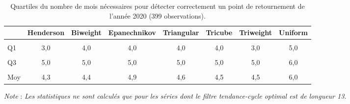 \documentclass[
  11pt,
  french,
  a4paper]{article}
\newcommand\1{\mathds{1}}
\begin{document}
\begin{table}[!h]

\caption{\label{tab:covid-tp-kernels}Quartiles du nombre de mois nécessaires pour détecter correctement un point de retournement de l'année 2020 (399 observations).}
\centering
\begin{tabular}[t]{lccccccc}
\toprule
  & Henderson & Biweight & Epanechnikov & Triangular & Tricube & Triweight & Uniform\\
\midrule
\cellcolor{gray!6}{Min} & \cellcolor{gray!6}{2,0} & \cellcolor{gray!6}{2,0} & \cellcolor{gray!6}{2,0} & \cellcolor{gray!6}{2,0} & \cellcolor{gray!6}{2,0} & \cellcolor{gray!6}{2,0} & \cellcolor{gray!6}{2,0}\\
Q1 & 3,0 & 4,0 & 4,0 & 4,0 & 4,0 & 3,0 & 5,0\\
\cellcolor{gray!6}{Méd.} & \cellcolor{gray!6}{4,0} & \cellcolor{gray!6}{4,0} & \cellcolor{gray!6}{5,0} & \cellcolor{gray!6}{4,0} & \cellcolor{gray!6}{4,0} & \cellcolor{gray!6}{4,0} & \cellcolor{gray!6}{6,0}\\
Q3 & 5,0 & 5,0 & 5,0 & 5,0 & 5,0 & 5,0 & 6,0\\
\cellcolor{gray!6}{Max} & \cellcolor{gray!6}{12,0} & \cellcolor{gray!6}{12,0} & \cellcolor{gray!6}{11,0} & \cellcolor{gray!6}{11,0} & \cellcolor{gray!6}{12,0} & \cellcolor{gray!6}{14,0} & \cellcolor{gray!6}{13,0}\\
\addlinespace
Moy & 4,3 & 4,4 & 4,9 & 4,6 & 4,5 & 4,5 & 6,0\\
\bottomrule
\end{tabular}
\footnotesize


\emph{Note} : \emph{Les statistiques ne sont calculés que pour les séries dont le filtre tendance-cycle optimal est de longueur 13.}
\normalsize\end{table}
\end{document}

